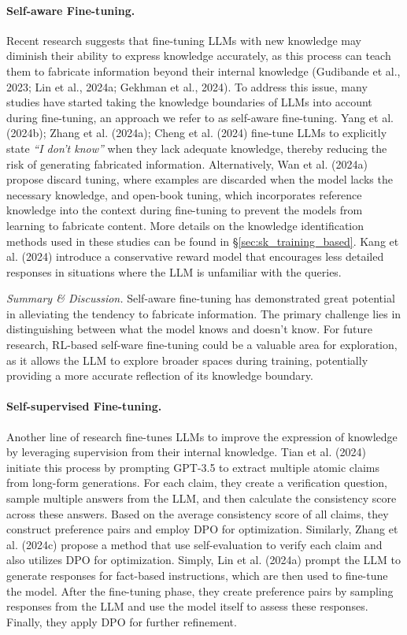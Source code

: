 \paragraph{Self-aware Fine-tuning.} Recent research suggests that fine-tuning LLMs with new knowledge may diminish their ability to express knowledge accurately, as this process can teach them to fabricate information beyond their internal knowledge (Gudibande et al., 2023; Lin et al., 2024a; Gekhman et al., 2024). To address this issue, many studies have started taking the knowledge boundaries of LLMs into account during fine-tuning, an approach we refer to as self-aware fine-tuning. Yang et al. (2024b); Zhang et al. (2024a); Cheng et al. (2024) fine-tune LLMs to explicitly state \emph{``I don't know''} when they lack adequate knowledge, thereby reducing the risk of generating fabricated information. Alternatively, Wan et al. (2024a) propose discard tuning, where examples are discarded when the model lacks the necessary knowledge, and open-book tuning, which incorporates reference knowledge into the context during fine-tuning to prevent the models from learning to fabricate content. More details on the knowledge identification methods used in these studies can be found in \S\ref{sec:sk_training_based}. Kang et al. (2024) introduce a conservative reward model that encourages less detailed responses in situations where the LLM is unfamiliar with the queries.

\emph{Summary \& Discussion.} Self-aware fine-tuning has demonstrated great potential in alleviating the tendency to fabricate information. The primary challenge lies in distinguishing between what the model knows and doesn't know. For future research, RL-based self-ware fine-tuning could be a valuable area for exploration, as it allows the LLM to explore broader spaces during training, potentially providing a more accurate reflection of its knowledge boundary.

\paragraph{Self-supervised Fine-tuning.} Another line of research fine-tunes LLMs to improve the expression of knowledge by leveraging supervision from their internal knowledge. Tian et al. (2024) initiate this process by prompting GPT-3.5 to extract multiple atomic claims from long-form generations. For each claim, they create a verification question, sample multiple answers from the LLM, and then calculate the consistency score across these answers. Based on the average consistency score of all claims, they construct preference pairs and employ DPO for optimization. Similarly, Zhang et al. (2024c) propose a method that use self-evaluation to verify each claim and also utilizes DPO for optimization. Simply, Lin et al. (2024a) prompt the LLM to generate responses for fact-based instructions, which are then used to fine-tune the model. After the fine-tuning phase, they create preference pairs by sampling responses from the LLM and use the model itself to assess these responses. Finally, they apply DPO for further refinement.

